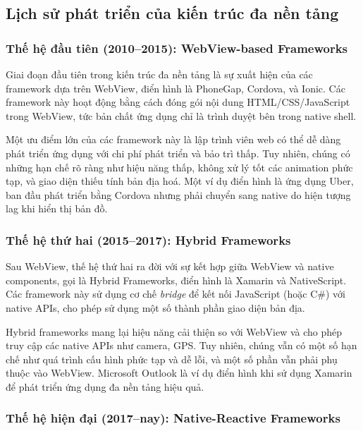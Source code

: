 \subsection{Lịch sử phát triển của kiến trúc đa nền tảng}

\subsubsection{Thế hệ đầu tiên (2010–2015): WebView-based Frameworks}
Giai đoạn đầu tiên trong kiến trúc đa nền tảng là sự xuất hiện của các framework dựa trên WebView, điển hình là PhoneGap, Cordova, và Ionic. Các framework này hoạt động bằng cách đóng gói nội dung HTML/CSS/JavaScript trong WebView, tức bản chất ứng dụng chỉ là trình duyệt bên trong native shell.

\vspace{0.5em}

\indent Một ưu điểm lớn của các framework này là lập trình viên web có thể dễ dàng phát triển ứng dụng với chi phí phát triển và bảo trì thấp. Tuy nhiên, chúng có những hạn chế rõ ràng như hiệu năng thấp, không xử lý tốt các animation phức tạp, và giao diện thiếu tính bản địa hoá. Một ví dụ điển hình là ứng dụng Uber, ban đầu phát triển bằng Cordova nhưng phải chuyển sang native do hiện tượng lag khi hiển thị bản đồ.

\subsubsection{Thế hệ thứ hai (2015–2017): Hybrid Frameworks}

Sau WebView, thế hệ thứ hai ra đời với sự kết hợp giữa WebView và native components, gọi là Hybrid Frameworks, điển hình là Xamarin và NativeScript. Các framework này sử dụng cơ chế \textit{bridge} để kết nối JavaScript (hoặc C\#) với native APIs, cho phép sử dụng một số thành phần giao diện bản địa.

\vspace{0.5em}

\indent Hybrid frameworks mang lại hiệu năng cải thiện so với WebView và cho phép truy cập các native APIs như camera, GPS. Tuy nhiên, chúng vẫn có một số hạn chế như quá trình cấu hình phức tạp và dễ lỗi, và một số phần vẫn phải phụ thuộc vào WebView. Microsoft Outlook là ví dụ điển hình khi sử dụng Xamarin để phát triển ứng dụng đa nền tảng hiệu quả.

\subsubsection{Thế hệ hiện đại (2017–nay): Native-Reactive Frameworks}

